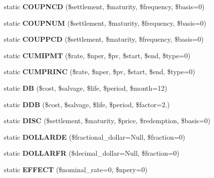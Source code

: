 \begin{DoxyCompactItemize}
\item 
static {\bfseries C\+O\+U\+P\+N\+C\+D} (\$settlement, \$maturity, \$frequency, \$basis=0)\label{class_p_h_p_excel___calculation___financial_a34f7586fd9701178dfd9541a59422bb7}

\item 
static {\bfseries C\+O\+U\+P\+N\+U\+M} (\$settlement, \$maturity, \$frequency, \$basis=0)\label{class_p_h_p_excel___calculation___financial_a3720c91ecc4c49ea3be26f90456f15cb}

\item 
static {\bfseries C\+O\+U\+P\+P\+C\+D} (\$settlement, \$maturity, \$frequency, \$basis=0)\label{class_p_h_p_excel___calculation___financial_a80a8092985557bd757c572b675c9e11a}

\item 
static {\bfseries C\+U\+M\+I\+P\+M\+T} (\$rate, \$nper, \$pv, \$start, \$end, \$type=0)\label{class_p_h_p_excel___calculation___financial_adaf360fa357dc8ff329f58f6b13db495}

\item 
static {\bfseries C\+U\+M\+P\+R\+I\+N\+C} (\$rate, \$nper, \$pv, \$start, \$end, \$type=0)\label{class_p_h_p_excel___calculation___financial_a0c0b956203a4f3f89e34fad388d36a5e}

\item 
static {\bfseries D\+B} (\$cost, \$salvage, \$life, \$period, \$month=12)\label{class_p_h_p_excel___calculation___financial_a62767987a1d79f371568e222e47e61d0}

\item 
static {\bfseries D\+D\+B} (\$cost, \$salvage, \$life, \$period, \$factor=2.)\label{class_p_h_p_excel___calculation___financial_a5645e0f88ec463b9beea9e0d324d42f8}

\item 
static {\bfseries D\+I\+S\+C} (\$settlement, \$maturity, \$price, \$redemption, \$basis=0)\label{class_p_h_p_excel___calculation___financial_ad16c627bc9b59c3e8ee519b1490440cc}

\item 
static {\bfseries D\+O\+L\+L\+A\+R\+D\+E} (\$fractional\+\_\+dollar=Null, \$fraction=0)\label{class_p_h_p_excel___calculation___financial_a070f1dc1462bdc1b6407e5b43bdcd3e4}

\item 
static {\bfseries D\+O\+L\+L\+A\+R\+F\+R} (\$decimal\+\_\+dollar=Null, \$fraction=0)\label{class_p_h_p_excel___calculation___financial_ad94dcc6c63d51e60d016bdd6c4c0cc3e}

\item 
static {\bfseries E\+F\+F\+E\+C\+T} (\$nominal\+\_\+rate=0, \$npery=0)\label{class_p_h_p_excel___calculation___financial_a0606b83118cb9a7db420f8597ce0c6a3}


\end{DoxyCompactItemize}
